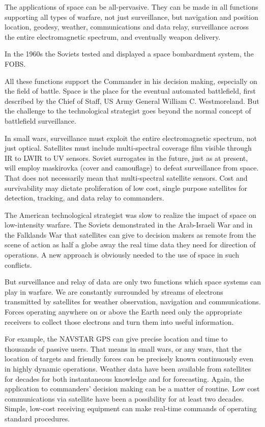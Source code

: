 The applications of space can be all-pervasive. They can be made in all functions supporting all types of warfare, not just surveillance, but navigation and position location, geodesy, weather, communications and data relay, surveillance across the entire electromagnetic spectrum, and eventually weapon delivery.

\begin{mdframed}[backgroundcolor=black!10]
In the 1960s the Soviets tested and displayed a space bombardment system, the FOBS.
\end{mdframed}

All these functions support the Commander in his decision making, especially on the field of battle. Space is the place for the eventual automated battlefield, first described by the Chief of Staff, US Army General William C. Westmoreland. But the challenge to the technological strategist goes beyond the normal concept of battlefield surveillance.

In small wars, surveillance must exploit the entire electromagnetic spectrum, not just optical. Satellites must include multi-spectral coverage film visible through IR to LWIR to UV sensors. Soviet surrogates in the future, just as at present, will employ maskirovka (cover and camouflage) to defeat surveillance from space. That does not necessarily mean that multi-spectral satellite sensors. Cost and survivability may dictate proliferation of low cost, single purpose satellites for detection, tracking, and data relay to commanders.

The American technological strategist was slow to realize the impact of space on low-intensity warfare. The Soviets demonstrated in the Arab-Israeli War and in the Falklands War that satellites can give to decision makers as remote from the scene of action as half a globe away the real time data they need for direction of operations. A new approach is obviously needed to the use of space in such conflicts.

But surveillance and relay of data are only two functions which space systems can play in warfare. We are constantly surrounded by streams of electrons transmitted by satellites for weather observation, navigation and communications. Forces operating anywhere on or above the Earth need only the appropriate receivers to collect those electrons and turn them into useful information.

For example, the NAVSTAR GPS can give precise location and time to thousands of passive users. That means in small wars, or any wars, that the location of targets and friendly forces can be precisely known continuously even in highly dynamic operations. Weather data have been available from satellites for decades for both instantaneous knowledge and for forecasting. Again, the application to commanders' decision making can be a matter of routine. Low cost communications via satellite have been a possibility for at least two decades. Simple, low-cost receiving equipment can make real-time commands of operating standard procedures.

